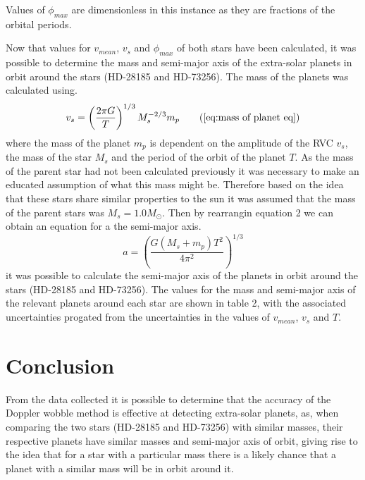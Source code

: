 \documentclass[]{article}
\begin{document}
Values of $\phi_{max}$ are dimensionless in this instance as they are
fractions of the orbital periods.
\par
Now that values for $v_{mean}$, $v_{s}$ and $\phi_{max}$ of both stars have 
been calculated, it was possible to determine the mass and semi-major axis of the
extra-solar planets in orbit around the stars (HD-28185 and HD-73256).
The mass of the planets was calculated using.
\begin{equation}
  v_s = \left(\frac{2\pi G}{T}\right)^{1/3}M_s^{-2/3}m_p \tag{\ref{eq:mass of planet eq}}
\end{equation}
where the mass of the planet $m_p $ is dependent on the amplitude of the RVC $v_{s}$, the mass of the star $M_s$ and the period of the orbit of the planet $T$.
As the mass of the parent star had not been calculated previously it was necessary to
make an educated assumption of what this mass might be. Therefore based on the idea 
that these stars share similar properties to the sun it was assumed that the mass of
the parent stars was $M_s = 1.0M_{\odot}$. Then by rearrangin equation 2 we can 
obtain an equation for a the semi-major axis.
\begin{equation}
  a = \left(\frac{G(M_s+m_p)T^2}{4\pi^2}\right)^{1/3}
  \end{equation}
it was possible to calculate the semi-major axis of the planets in orbit around the
stars (HD-28185 and HD-73256). The values for the mass and semi-major axis of the 
relevant planets around each star are shown in table 2, with the associated 
uncertainties progated from the uncertainties in the values of $v_{mean}$, $v_{s}$
and $T$.


  \par
  
\section*{Conclusion}
From the data collected it is possible to determine that the 
accuracy of the Doppler wobble method is effective at detecting 
extra-solar planets, as, when comparing the two stars (HD-28185 and HD-73256)
with similar masses, their respective planets have 
similar masses and semi-major axis of orbit, giving rise to the 
idea that for a star with a particular mass there is a likely chance
that a planet with a similar mass will be in orbit around it.
\par


\end{document}
